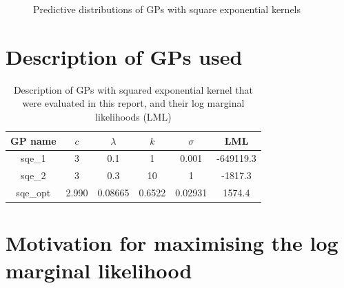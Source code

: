 \documentclass{article}
\begin{document}

\begin{figure}[pht]
    \centering
    \caption{Predictive distributions of GPs with square exponential kernels}
    \label{fig:pred_samples}
\end{figure}


\section{Description of GPs used}\label{appendix:gp_table}


\begin{table}[ht]
\centering
\begin{tabular}{|c|c|c|c|c|c|}
\hline
GP name  & $c$   & $\lambda$ & $k$    & $\sigma$ & LML       \\
\hline
sqe\_1   & 3     & 0.1       & 1      & 0.001    & -649119.3 \\
sqe\_2   & 3     & 0.3       & 10     & 1        & -1817.3   \\
sqe\_opt & 2.990 & 0.08665   & 0.6522 & 0.02931  & 1574.4    \\
\hline
\end{tabular}
\caption{Description of GPs with squared exponential kernel that were evaluated in this report, and their log marginal likelihoods (LML)}
\label{table:sqe_table}
\end{table}


\section{Motivation for maximising the log marginal likelihood}\label{appendix:why_lml}




\end{document}
